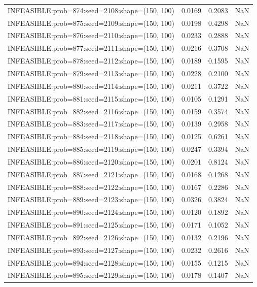 \begin{longtable}{lccc}
INFEASIBLE:prob=874:seed=2108:shape=(150, 100) &   0.0169 &  0.2083 &    NaN \\
INFEASIBLE:prob=875:seed=2109:shape=(150, 100) &   0.0198 &  0.4298 &    NaN \\
INFEASIBLE:prob=876:seed=2110:shape=(150, 100) &   0.0233 &  0.2888 &    NaN \\
INFEASIBLE:prob=877:seed=2111:shape=(150, 100) &   0.0216 &  0.3708 &    NaN \\
INFEASIBLE:prob=878:seed=2112:shape=(150, 100) &   0.0189 &  0.1595 &    NaN \\
INFEASIBLE:prob=879:seed=2113:shape=(150, 100) &   0.0228 &  0.2100 &    NaN \\
INFEASIBLE:prob=880:seed=2114:shape=(150, 100) &   0.0211 &  0.3722 &    NaN \\
INFEASIBLE:prob=881:seed=2115:shape=(150, 100) &   0.0105 &  0.1291 &    NaN \\
INFEASIBLE:prob=882:seed=2116:shape=(150, 100) &   0.0159 &  0.3574 &    NaN \\
INFEASIBLE:prob=883:seed=2117:shape=(150, 100) &   0.0139 &  0.2958 &    NaN \\
INFEASIBLE:prob=884:seed=2118:shape=(150, 100) &   0.0125 &  0.6261 &    NaN \\
INFEASIBLE:prob=885:seed=2119:shape=(150, 100) &   0.0247 &  0.3394 &    NaN \\
INFEASIBLE:prob=886:seed=2120:shape=(150, 100) &   0.0201 &  0.8124 &    NaN \\
INFEASIBLE:prob=887:seed=2121:shape=(150, 100) &   0.0168 &  0.1268 &    NaN \\
INFEASIBLE:prob=888:seed=2122:shape=(150, 100) &   0.0167 &  0.2286 &    NaN \\
INFEASIBLE:prob=889:seed=2123:shape=(150, 100) &   0.0326 &  0.3824 &    NaN \\
INFEASIBLE:prob=890:seed=2124:shape=(150, 100) &   0.0120 &  0.1892 &    NaN \\
INFEASIBLE:prob=891:seed=2125:shape=(150, 100) &   0.0171 &  0.1052 &    NaN \\
INFEASIBLE:prob=892:seed=2126:shape=(150, 100) &   0.0132 &  0.2196 &    NaN \\
INFEASIBLE:prob=893:seed=2127:shape=(150, 100) &   0.0232 &  0.2616 &    NaN \\
INFEASIBLE:prob=894:seed=2128:shape=(150, 100) &   0.0155 &  0.1215 &    NaN \\
INFEASIBLE:prob=895:seed=2129:shape=(150, 100) &   0.0178 &  0.1407 &    NaN \\

\end{longtable}
